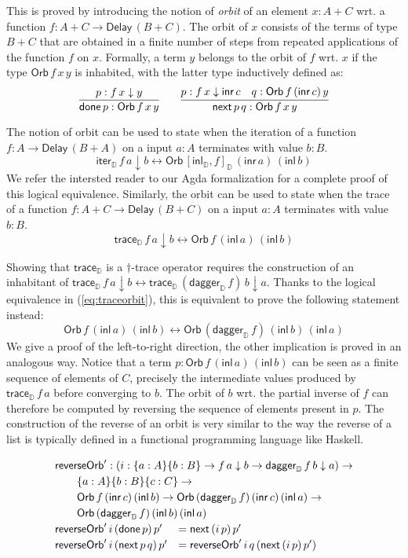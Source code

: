 \documentclass[runningheads,a4paper]{llncs}
\newcommand{\inl}{\mathsf{inl}}
\newcommand{\inr}{\mathsf{inr}}
\newcommand{\Delay}{\ensuremath{\mathsf{Delay}\,}}
\newcommand{\dn}{\downarrow}
\newcommand{\D}{\mathbb{D}}
\newcommand{\copairD}[2]{[#1,#2]_{\D}}
\newcommand{\inlD}{\mathsf{inl}_{\D}}
\newcommand{\iterD}{\mathsf{iter}_\D}
\newcommand{\traceD}{\mathsf{trace}_\D}
\newcommand{\daggerD}{\mathsf{dagger}_\D}
\newcommand{\Orb}[3]{\mathsf{Orb}\,#1\,#2\,#3}
\newcommand{\done}{\mathsf{done}}
\renewcommand{\next}{\mathsf{next}}
\newcommand{\reverseOrbit}{\mathsf{reverseOrb}}
\begin{document}
This is proved by introducing the notion of \emph{orbit} of an element
$x : A + C$ wrt. a function $f : A + C \to \Delay (B + C)$. The orbit of
$x$ consists of the terms of type $B + C$ that are obtained in a
finite number of steps from repeated applications of the function $f$
on $x$. Formally, a term $y$ belongs to the orbit of $f$ wrt. $x$ if
the type $\Orb f x y $ is inhabited, with the latter type
inductively defined as: 
\[
\infer{\done\,p : \Orb f x y}{p : f \,x \dn y}
\qquad 
\infer{\next\,p \,q : \Orb f x y}{p : f \,x \dn \inr\,c & q : \Orb f
  {(\inr\,c)} y}
\]

The notion of orbit can be used to state when 
the iteration of a function $f : A \to \Delay (B + A)$ on a input
$a : A$ terminates with value $b : B$.
\[
\iterD\,f\,a \dn b \leftrightarrow \Orb {\copairD{\inlD}{f}} {(\inr\,a)} {(\inl\,b)}
\]
We refer the intersted reader to our Agda formalization for a complete
proof of this logical equivalence.
Similarly, the orbit can be used to state when 
the trace of a function $f : A + C \to \Delay (B + C)$ on a input
$a : A$ terminates with value $b : B$.
\begin{equation}\label{eq:traceorbit}
\traceD\,f\,a \dn b \leftrightarrow \Orb f{(\inl\,a)} {(\inl\,b)}
\end{equation}

Showing that $\traceD$ is a $\dagger$-trace operator requires the
construction of an inhabitant of $\traceD\,f\,a \dn b \leftrightarrow
\traceD\,(\daggerD\,f)\,b \dn a$. Thanks to the logical equivalence in
(\ref{eq:traceorbit}), this is equivalent to prove the following
statement instead: 
\[
\Orb f {(\inl\,a)} {(\inl\,b)} \leftrightarrow \Orb {(\daggerD\,f)} {(\inl\,b)} {(\inl\,a)}
\]
We give a proof of the left-to-right direction, the other implication
is proved in an analogous way.  Notice that a term
$p : \Orb f {(\inl\,a)} {(\inl\,b)}$ can be seen as a finite sequence of
elements of $C$, precisely the intermediate values produced by
$\traceD\,f\,a$ before converging to $b$. The orbit of $b$ wrt. the
partial inverse of $f$ can therefore be computed by reversing the
sequence of elements present in $p$. The construction of the reverse
of an orbit is very similar to the way the reverse of a list is typically
defined in a functional programming language like Haskell.

\[
\def\arraystretch{1.2}
\begin{array}{ll}
\multicolumn{2}{l}{\reverseOrbit' : (i : \{a : A\} \{b : B\} \to f \,a
\dn b \to \daggerD\,f  \,b \dn a) \to } \\
\multicolumn{2}{l}{\qquad \{a : A\} \{b : B\} \{c : C\} \to } \\
\multicolumn{2}{l}{\qquad \Orb f {(\inr\,c)}
 {(\inl\,b)} \to \Orb  {(\daggerD\,f)} {(\inr\,c)} {(\inl\,a)} \to } \\
\multicolumn{2}{l}{\qquad \Orb  {(\daggerD\,f)} {(\inl\,b)} {(\inl\,a)}}\\
\reverseOrbit' \,i\, (\done \,p) \,p'&= \next\, (i \,p)\,p' \\
\reverseOrbit' \,i\,(\next\,p\,q) \,p'&= \reverseOrbit' \,i\,q \,(\next \,(i\,p)\,p')
\end{array}
\]
\end{document}
